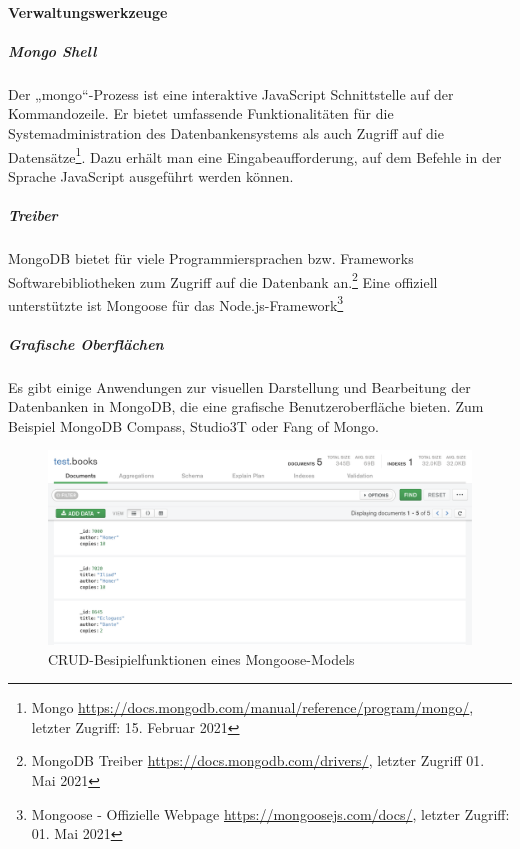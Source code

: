 \paragraph{Verwaltungswerkzeuge}
\noindent
\subparagraph{Mongo Shell}
Der „mongo“-Prozess ist eine interaktive JavaScript Schnittstelle auf der Kommandozeile. Er bietet umfassende Funktionalitäten für die Systemadministration des Datenbankensystems als auch Zugriff auf die Datensätze\footnote{Mongo \url{https://docs.mongodb.com/manual/reference/program/mongo/}, letzter Zugriff: 15. Februar 2021}. Dazu erhält man eine Eingabeaufforderung, auf dem Befehle in der Sprache JavaScript ausgeführt werden können.
\noindent
\subparagraph{Treiber}
MongoDB bietet für viele Programmiersprachen bzw. Frameworks Softwarebibliotheken zum Zugriff auf die Datenbank an.\footnote{MongoDB Treiber \url{https://docs.mongodb.com/drivers/}, letzter Zugriff 01. Mai 2021}  Eine offiziell unterstützte ist Mongoose für das Node.js-Framework\footnote{Mongoose - Offizielle Webpage \url{https://mongoosejs.com/docs/}, letzter Zugriff: 01. Mai 2021}
\newpage
\noindent
\subparagraph{Grafische Oberflächen}
Es gibt einige Anwendungen zur visuellen Darstellung und Bearbeitung der Datenbanken in MongoDB, die eine grafische Benutzeroberfläche bieten. Zum Beispiel MongoDB Compass, Studio3T oder Fang of Mongo. 


\begin{figure}[tbt]
\centering
\includegraphics[width=15cm]{images/mongodb_compass.png}
\caption{CRUD-Besipielfunktionen eines Mongoose-Models}
\end{figure}